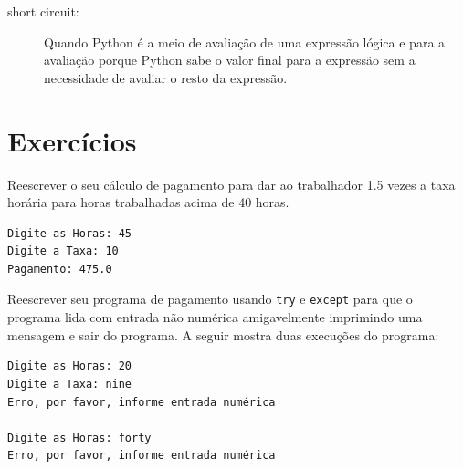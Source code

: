 {\begin{description}
\item[short circuit:] Quando Python é a meio de avaliação de uma expressão 
lógica e para a avaliação porque Python 
sabe o valor final para a expressão
sem a necessidade de avaliar o resto da expressão.

\end{description}

\section{Exercícios}

\begin{ex}
Reescrever o seu cálculo de pagamento para dar ao trabalhador 1.5
vezes a taxa horária para
horas trabalhadas acima de 40 horas.

\begin{verbatim}
Digite as Horas: 45
Digite a Taxa: 10
Pagamento: 475.0
\end{verbatim}
\end{ex}

\begin{ex}
Reescrever seu programa de pagamento usando {\tt try} e {\tt except} 
para que o programa lida com entrada não numérica amigavelmente
imprimindo uma mensagem e sair do programa.
A seguir mostra duas execuções do programa:

\begin{verbatim}
Digite as Horas: 20
Digite a Taxa: nine
Erro, por favor, informe entrada numérica

Digite as Horas: forty
Erro, por favor, informe entrada numérica
\end{verbatim}
\end{ex}

}
